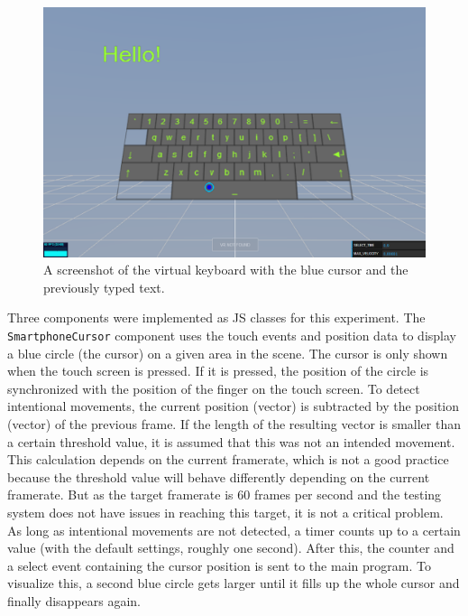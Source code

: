 \begin{figure}[H]
  \centering
  \includegraphics[width=12cm]{figures/screenshot_exp_vk.png}
  \caption[Screenshot of the virtual keyboard experiment]{A screenshot of the virtual keyboard with the blue cursor and the previously typed text.}\label{fig:screenshot-exp-vk}
\end{figure}

Three components were implemented as \acl{JS} classes for this experiment. The \lstinline{SmartphoneCursor} component uses the touch events and position data to display a blue circle (the cursor) on a given area in the scene. The cursor is only shown when the touch screen is pressed. If it is pressed, the position of the circle is synchronized with the position of the finger on the touch screen. To detect intentional movements, the current position (vector) is subtracted by the position (vector) of the previous frame. If the length of the resulting vector is smaller than a certain threshold value, it is assumed that this was not an intended movement. This calculation depends on the current framerate, which is not a good practice because the threshold value will behave differently depending on the current framerate. But as the target framerate is 60 frames per second and the testing system does not have issues in reaching this target, it is not a critical problem.
As long as intentional movements are not detected, a timer counts up to a certain value (with the default settings, roughly one second). After this, the counter and a select event containing the cursor position is sent to the main program. To visualize this, a second blue circle gets larger until it fills up the whole cursor and finally disappears again. 

